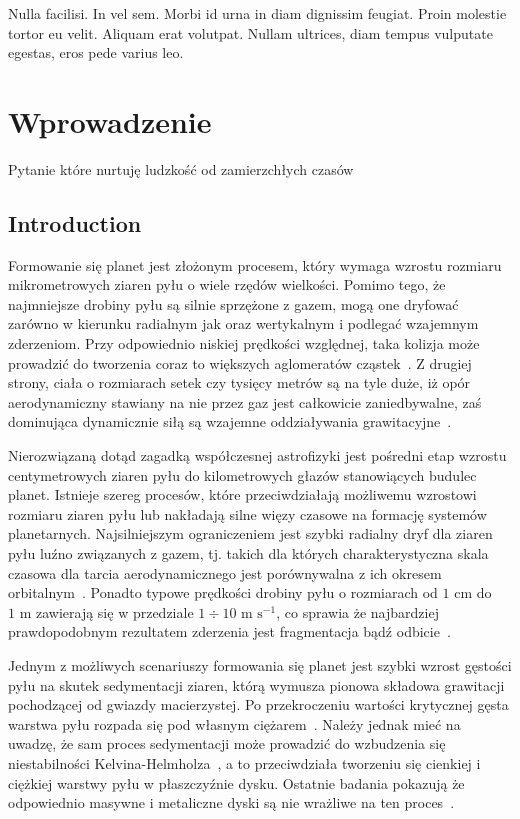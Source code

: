 \begin{savequote}[75mm]
Nulla facilisi. In vel sem. Morbi id urna in diam dignissim feugiat. Proin molestie tortor eu velit. Aliquam erat volutpat. Nullam ultrices, diam tempus vulputate egestas, eros pede varius leo.
\end{savequote}

\chapter{Wprowadzenie}

 Pytanie które nurtuję ludzkość od
zamierzchłych czasów 

\section{Introduction}

Formowanie się planet jest złożonym procesem, który wymaga wzrostu rozmiaru
mikrometrowych ziaren pyłu o wiele rzędów wielkości. Pomimo tego, że najmniejsze
drobiny pyłu są silnie sprzężone z gazem, mogą one dryfować zarówno w kierunku
radialnym jak oraz wertykalnym i podlegać wzajemnym zderzeniom. Przy odpowiednio
niskiej prędkości względnej, taka kolizja może prowadzić do tworzenia coraz to
większych aglomeratów cząstek~\citep{BW08}. Z drugiej strony, ciała o rozmiarach
setek czy tysięcy metrów są na tyle duże, iż opór aerodynamiczny stawiany na nie
przez gaz jest całkowicie zaniedbywalne, zaś dominująca dynamicznie siłą są
wzajemne oddziaływania grawitacyjne~\citep{KKI06}.

\par Nierozwiązaną dotąd zagadką współczesnej astrofizyki jest pośredni etap
wzrostu centymetrowych ziaren pyłu do kilometrowych głazów stanowiących budulec
planet. Istnieje szereg procesów, które przeciwdziałają możliwemu wzrostowi
rozmiaru ziaren pyłu lub nakładają silne więzy czasowe na formację systemów
planetarnych. Najsilniejszym ograniczeniem jest szybki radialny dryf dla ziaren
pyłu luźno związanych z gazem, tj. takich dla których charakterystyczna skala
czasowa dla tarcia aerodynamicznego jest porównywalna z ich okresem
orbitalnym~\citep{W77}. Ponadto typowe prędkości drobiny pyłu o rozmiarach od
$1\textrm{ cm}$ do $1\textrm{ m}$ zawierają się w przedziale $1\div10\textrm{ m
s}^{-1}$, co sprawia że najbardziej prawdopodobnym rezultatem zderzenia jest
fragmentacja bądź odbicie~\citep{Z10}.

\par Jednym z możliwych scenariuszy formowania się planet jest szybki wzrost
gęstości pyłu na skutek sedymentacji ziaren, którą wymusza pionowa składowa
grawitacji pochodzącej od gwiazdy macierzystej. Po przekroczeniu wartości
krytycznej gęsta warstwa pyłu rozpada się pod własnym ciężarem~\citep{GW73}.
Należy jednak mieć na uwadzę, że sam proces sedymentacji może prowadzić do
wzbudzenia się niestabilności Kelvina-Helmholza~\cite{JHK06}, a to przeciwdziała
tworzeniu się cienkiej i ciężkiej warstwy pyłu w płaszczyźnie dysku. Ostatnie
badania pokazują że odpowiednio masywne i metaliczne dyski są nie wrażliwe na
ten proces~\citep{L10}.

